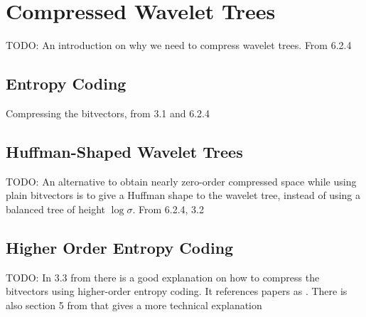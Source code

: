 \clearpage
\section{Compressed Wavelet Trees}
TODO: An introduction on why we need to compress wavelet trees. From \cite{navarro2016compact} 6.2.4

\subsection{Entropy Coding}
Compressing the bitvectors, from \cite{WTForALL} 3.1 and \cite{navarro2016compact} 6.2.4

\subsection{Huffman-Shaped Wavelet Trees}
TODO: An alternative to obtain nearly zero-order compressed space while using plain bitvectors is to
give a Huffman shape to the wavelet tree, instead of using a balanced tree of height $\log \sigma$. From \cite{navarro2016compact} 6.2.4, \cite{WTForALL} 3.2

\subsection{Higher Order Entropy Coding}
TODO: In 3.3 from \cite{WTForALL} there is a good explanation on how to compress the bitvectors using higher-order entropy coding. It references papers as \cite{grossi2004indexing}. There is also section 5 from \cite{TheMyriadVirtuesWT} that gives a more technical explanation
